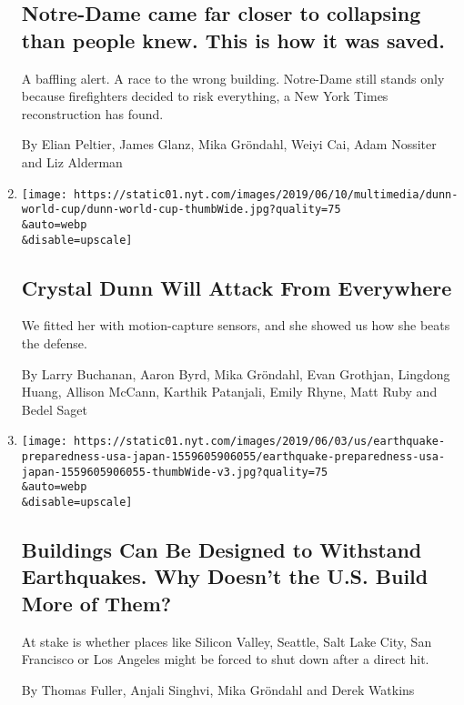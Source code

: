 \begin{enumerate}
  \hypertarget{notre-dame-came-far-closer-to-collapsing-than-people-knew-this-is-how-it-was-saved}{%
  \subsection{Notre-Dame came far closer to collapsing than people knew.
  This is how it was
  saved.}\label{notre-dame-came-far-closer-to-collapsing-than-people-knew-this-is-how-it-was-saved}}

  A baffling alert. A race to the wrong building. Notre-Dame still
  stands only because firefighters decided to risk everything, a New
  York Times reconstruction has found.

  By Elian Peltier, James Glanz, Mika Gröndahl, Weiyi Cai, Adam Nossiter
  and Liz Alderman
\item
  \href{/interactive/2019/06/11/sports/world-cup/crystal-dunn-world-cup.html}{}

  \texttt{[image: https://static01.nyt.com/images/2019/06/10/multimedia/dunn-world-cup/dunn-world-cup-thumbWide.jpg?quality=75\\\&auto=webp\\\&disable=upscale]}

  \hypertarget{crystal-dunn-will-attack-from-everywhere}{%
  \subsection{Crystal Dunn Will Attack From
  Everywhere}\label{crystal-dunn-will-attack-from-everywhere}}

  We fitted her with motion-capture sensors, and she showed us how she
  beats the defense.

  By Larry Buchanan, Aaron Byrd, Mika Gröndahl, Evan Grothjan, Lingdong
  Huang, Allison McCann, Karthik Patanjali, Emily Rhyne, Matt Ruby and
  Bedel Saget
\item
  \href{/interactive/2019/06/03/us/earthquake-preparedness-usa-japan.html}{}

  \texttt{[image: https://static01.nyt.com/images/2019/06/03/us/earthquake-preparedness-usa-japan-1559605906055/earthquake-preparedness-usa-japan-1559605906055-thumbWide-v3.jpg?quality=75\\\&auto=webp\\\&disable=upscale]}

  \hypertarget{buildings-can-be-designed-to-withstand-earthquakes-why-doesnt-the-us-build-more-of-them}{%
  \subsection{Buildings Can Be Designed to Withstand Earthquakes. Why
  Doesn't the U.S. Build More of
  Them?}\label{buildings-can-be-designed-to-withstand-earthquakes-why-doesnt-the-us-build-more-of-them}}

  At stake is whether places like Silicon Valley, Seattle, Salt Lake
  City, San Francisco or Los Angeles might be forced to shut down after
  a direct hit.

  By Thomas Fuller, Anjali Singhvi, Mika Gröndahl and Derek Watkins
\end{enumerate}

